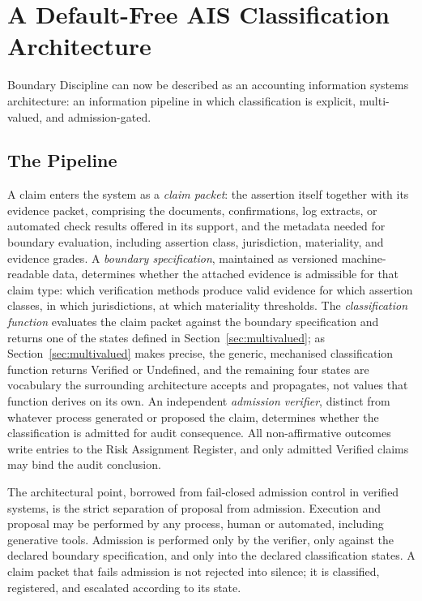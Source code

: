 \documentclass[11pt,a4paper]{article}
\theoremstyle{definition}
\theoremstyle{remark}
\begin{document}
\section{A Default-Free AIS Classification Architecture}
\label{sec:architecture}

Boundary Discipline can now be described as an accounting information systems architecture: an information pipeline in which classification is explicit, multi-valued, and admission-gated.

\subsection{The Pipeline}
\label{sec:pipeline}

A claim enters the system as a \emph{claim packet}: the assertion itself together with its evidence packet, comprising the documents, confirmations, log extracts, or automated check results offered in its support, and the metadata needed for boundary evaluation, including assertion class, jurisdiction, materiality, and evidence grades. A \emph{boundary specification}, maintained as versioned machine-readable data, determines whether the attached evidence is admissible for that claim type: which verification methods produce valid evidence for which assertion classes, in which jurisdictions, at which materiality thresholds. The \emph{classification function} evaluates the claim packet against the boundary specification and returns one of the states defined in Section~\ref{sec:multivalued}; as Section~\ref{sec:multivalued} makes precise, the generic, mechanised classification function returns \textsf{Verified} or \textsf{Undefined}, and the remaining four states are vocabulary the surrounding architecture accepts and propagates, not values that function derives on its own. An independent \emph{admission verifier}, distinct from whatever process generated or proposed the claim, determines whether the classification is admitted for audit consequence. All non-affirmative outcomes write entries to the Risk Assignment Register, and only admitted \textsf{Verified} claims may bind the audit conclusion.

The architectural point, borrowed from fail-closed admission control in verified systems, is the strict separation of proposal from admission. Execution and proposal may be performed by any process, human or automated, including generative tools. Admission is performed only by the verifier, only against the declared boundary specification, and only into the declared classification states. A claim packet that fails admission is not rejected into silence; it is classified, registered, and escalated according to its state.
\end{document}
